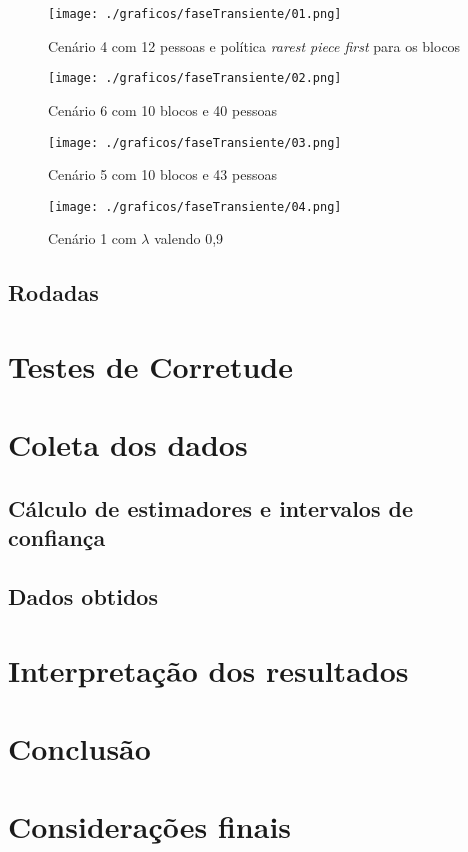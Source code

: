 \documentclass[a4paper,10pt]{article}
\begin{document}
\pagebreak

\begin{figure}
	\caption{Cenário 4 com 12 pessoas e política \textit{rarest piece first} para os blocos}
	\label{grafTransienteCen4b02n12rf}
	\texttt{[image: ./graficos/faseTransiente/01.png]}
\end{figure}

\begin{figure}
	\caption{Cenário 6 com 10 blocos e 40 pessoas}
	\label{grafTransienteCen6b10n40rr}
	\texttt{[image: ./graficos/faseTransiente/02.png]}
\end{figure}

\clearpage

\begin{figure}
	\caption{Cenário 5 com 10 blocos e 43 pessoas}
	\label{grafTransienteCen5b10n43rr}
	\texttt{[image: ./graficos/faseTransiente/03.png]}
\end{figure}

\begin{figure}
	\caption{Cenário 1 com $\lambda$ valendo 0,9}
	\label{grafTransienteCen1lamb0.9}
	\texttt{[image: ./graficos/faseTransiente/04.png]}
\end{figure}

\clearpage
\pagebreak

\subsection{Rodadas} %

\pagebreak

\section{Testes de Corretude}\label{TestesDeCorretude}

\pagebreak

\section{Coleta dos dados}\label{ColetaDosDados}

\subsection{Cálculo de estimadores e intervalos de confiança} %

\subsection{Dados obtidos} %

\pagebreak

\section{Interpretação dos resultados}

\pagebreak

\section{Conclusão}

\pagebreak

\section{Considerações finais}

\pagebreak
\end{document}
